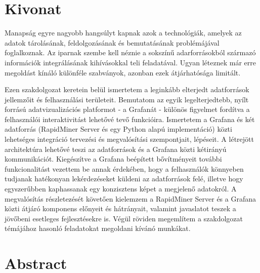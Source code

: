 \setcounter{page}{1}

\selecthungarian

\chapter*{Kivonat}

Manapság egyre nagyobb hangsúlyt kapnak azok a technológiák, amelyek az adatok tárolásának, feldolgozásának és bemutatásának problémájával foglalkoznak. Az iparnak szembe kell néznie a sokszínű adarforrásokból származó információk integrálásának kihívásokkal teli feladatával. Ugyan léteznek már erre megoldást kínáló különféle szabványok, azonban ezek átjárhatósága limitált.

Ezen szakdolgozat keretein belül ismertetem a leginkább elterjedt adatforrások jellemzőit és felhasználási területeit. Bemutatom az egyik legelterjedtebb, nyílt forrású adatvizualizációs platformot - a Grafanát - különös figyelmet fordítva a felhasználói interaktivitást lehetővé tevő funkcióira. Ismertetem a Grafana és két adatforrás (RapidMiner Server és egy Python alapú implementáció) közti lehetséges integráció tervezési és megvalósítási szempontjait, lépéseit. A létrejött architektúra lehetővé teszi az adatforrások és a Grafana közti kétirányú kommunikációt. Kiegészítve a Grafana beépített bővítményeit további funkcionalitást vezettem be annak érdekében, hogy a felhasználók könnyeben tudjanak hatékonyan lekérdezéseket küldeni az adatforrások felé, illetve hogy egyszerűbben kaphassanak egy konzisztens képet a megjelenő adatokról. A megvalósítás részletezését követően kielemzem a RapidMiner Server és a Grafana közti átjáró komponens előnyeit és hátrányait, valamint javaslatot teszek a jövőbeni esetleges fejlesztésekre is. Végül röviden megemlítem a szakdolgozat témájához hasonló feladatokat megoldani kívánó munkákat.




\vfill
\selectenglish


\chapter*{Abstract}

